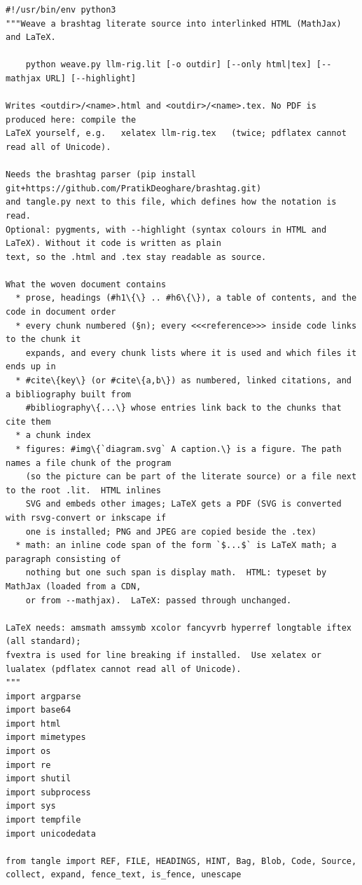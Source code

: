 \documentclass[10pt,a4paper]{article}
\newcounter{chunk}
\begin{document}
\begin{Verbatim}
#!/usr/bin/env python3
"""Weave a brashtag literate source into interlinked HTML (MathJax) and LaTeX.

    python weave.py llm-rig.lit [-o outdir] [--only html|tex] [--mathjax URL] [--highlight]

Writes <outdir>/<name>.html and <outdir>/<name>.tex. No PDF is produced here: compile the
LaTeX yourself, e.g.   xelatex llm-rig.tex   (twice; pdflatex cannot read all of Unicode).

Needs the brashtag parser (pip install git+https://github.com/PratikDeoghare/brashtag.git)
and tangle.py next to this file, which defines how the notation is read.
Optional: pygments, with --highlight (syntax colours in HTML and LaTeX). Without it code is written as plain
text, so the .html and .tex stay readable as source.

What the woven document contains
  * prose, headings (#h1\{\} .. #h6\{\}), a table of contents, and the code in document order
  * every chunk numbered (§n); every <<<reference>>> inside code links to the chunk it
    expands, and every chunk lists where it is used and which files it ends up in
  * #cite\{key\} (or #cite\{a,b\}) as numbered, linked citations, and a bibliography built from
    #bibliography\{...\} whose entries link back to the chunks that cite them
  * a chunk index
  * figures: #img\{`diagram.svg` A caption.\} is a figure. The path names a file chunk of the program
    (so the picture can be part of the literate source) or a file next to the root .lit.  HTML inlines
    SVG and embeds other images; LaTeX gets a PDF (SVG is converted with rsvg-convert or inkscape if
    one is installed; PNG and JPEG are copied beside the .tex)
  * math: an inline code span of the form `$...$` is LaTeX math; a paragraph consisting of
    nothing but one such span is display math.  HTML: typeset by MathJax (loaded from a CDN,
    or from --mathjax).  LaTeX: passed through unchanged.

LaTeX needs: amsmath amssymb xcolor fancyvrb hyperref longtable iftex (all standard);
fvextra is used for line breaking if installed.  Use xelatex or lualatex (pdflatex cannot read all of Unicode).
"""
import argparse
import base64
import html
import mimetypes
import os
import re
import shutil
import subprocess
import sys
import tempfile
import unicodedata

from tangle import REF, FILE, HEADINGS, HINT, Bag, Blob, Code, Source, collect, expand, fence_text, is_fence, unescape


\end{Verbatim}
\end{document}
